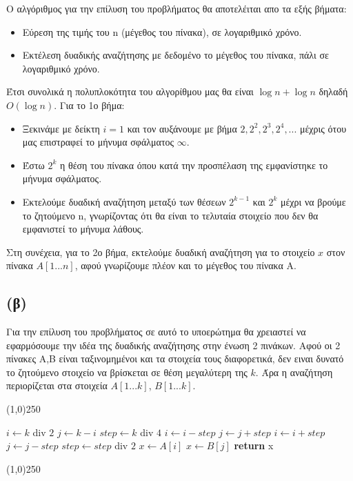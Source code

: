 \documentclass[a4paper,12pt]{report}
\begin{document}
Ο αλγόριθμος για την επίλυση του προβλήματος θα αποτελέιται απο τα εξής βήματα:
\begin{itemize}
 \item Εύρεση της τιμής του n (μέγεθος του πίνακα), σε λογαριθμικό χρόνο.
 \item Εκτέλεση δυαδικής αναζήτησης με δεδομένο το μέγεθος του πίνακα, πάλι σε λογαριθμικό χρόνο.
\end{itemize} 

Έτσι συνολικά η πολυπλοκότητα του αλγορίθμου μας θα είναι $\log n + \log n$ δηλαδή $O(\log n)$. Για το 1ο βήμα:
\begin{itemize}
 \item Ξεκινάμε με δείκτη $i=1$ και τον αυξάνουμε με βήμα $2,2^2,2^3,2^4,...$ μέχρις ότου μας επιστραφεί το μήνυμα σφάλματος $\infty$.
 \item Έστω $2^k$ η θέση του πίνακα όπου κατά την προσπέλαση της εμφανίστηκε το μήνυμα σφάλματος.
 \item Εκτελούμε δυαδική αναζήτηση μεταξύ των θέσεων $2^{k-1}$ και $2^{k}$ μέχρι να βρούμε το ζητούμενο n, γνωρίζοντας ότι θα είναι το τελυταία στοιχείο που δεν θα εμφανιστεί το μήνυμα λάθους.
\end{itemize}

Στη συνέχεια, για το 2ο βήμα, εκτελούμε δυαδική αναζήτηση για το στοιχείο $x$ στον πίνακα $A[1...n]$, αφού γνωρίζουμε πλέον και το μέγεθος του πίνακα Α.

\subsection*{(β)}
Για την επίλυση του προβλήματος σε αυτό το υποερώτημα θα χρειαστεί να εφαρμόσουμε την ιδέα της δυαδικής αναζήτησης στην ένωση 2 πινάκων. 
Αφού οι 2 πίνακες Α,Β είναι ταξινομημένοι και τα στοιχεία τους διαφορετικά, δεν ειναι δυνατό το ζητούμενο στοιχείο να βρίσκεται σε θέση μεγαλύτερη
της $k$. Άρα η αναζήτηση περιορίζεται στα στοιχεία $A[1...k]$, $B[1...k]$. 

\begin{center}
\line(1,0){250} 
\begin{algorithmic}[1]
  \State $i \gets k$ div $2$
  \State $j \gets k-i$
  \State $step \gets k$ div $4$
      \State $i \gets i-step$
      \State $j \gets j+step$
    \Else
      \State $i \gets i+step$
      \State $j \gets j-step$
    \EndIf
    \State $step \gets step$ div $2$
  \EndWhile
    \State $x \gets A[i]$
  \Else
    \State $x \gets B[j]$
  \EndIf
  \State \textbf{return} x 
\EndProcedure
\end{algorithmic}
\line(1,0){250} 
\end{center}
\end{document}
